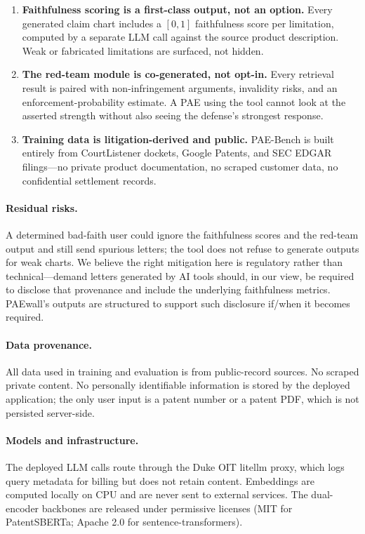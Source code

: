 \documentclass[11pt]{article}
\begin{document}
\begin{enumerate}
    \item \textbf{Faithfulness scoring is a first-class output, not an option.} Every generated claim chart includes a $[0,1]$ faithfulness score per limitation, computed by a separate LLM call against the source product description. Weak or fabricated limitations are surfaced, not hidden.
    \item \textbf{The red-team module is co-generated, not opt-in.} Every retrieval result is paired with non-infringement arguments, invalidity risks, and an enforcement-probability estimate. A PAE using the tool cannot look at the asserted strength without also seeing the defense's strongest response.
    \item \textbf{Training data is litigation-derived and public.} PAE-Bench is built entirely from CourtListener dockets, Google Patents, and SEC EDGAR filings---no private product documentation, no scraped customer data, no confidential settlement records.
\end{enumerate}

\paragraph{Residual risks.} A determined bad-faith user could ignore the faithfulness scores and the red-team output and still send spurious letters; the tool does not refuse to generate outputs for weak charts. We believe the right mitigation here is regulatory rather than technical---demand letters generated by AI tools should, in our view, be required to disclose that provenance and include the underlying faithfulness metrics. PAEwall's outputs are structured to support such disclosure if/when it becomes required.

\paragraph{Data provenance.} All data used in training and evaluation is from public-record sources. No scraped private content. No personally identifiable information is stored by the deployed application; the only user input is a patent number or a patent PDF, which is not persisted server-side.

\paragraph{Models and infrastructure.} The deployed LLM calls route through the Duke OIT litellm proxy, which logs query metadata for billing but does not retain content. Embeddings are computed locally on CPU and are never sent to external services. The dual-encoder backbones are released under permissive licenses (MIT for PatentSBERTa; Apache 2.0 for sentence-transformers).
\end{document}
